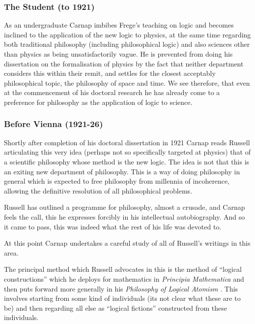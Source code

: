 \documentclass[10pt,titlepage]{book}
\newcommand{\ignore}[1]{}
\begin{document}
\subsubsection{The Student (to 1921)}

As an undergraduate Carnap imbibes Frege's teaching on logic and becomes inclined to the application of the new logic to physics, at the same  time regarding both traditional philosophy (including philosophical logic) and also sciences other than physics as being unsatisfactorily vague.
He is prevented from doing his dissertation on the formalisation of physics by the fact that neither department considers this within their remit, and settles for the closest acceptably philosophical topic, the philosophy of space and time.
We see therefore, that even at the commencement of his doctoral research he has already come to a preference for philosophy as the application of logic to science.

\subsubsection{Before Vienna (1921-26)}

Shortly after completion of his doctoral dissertation in 1921 Carnap reads Russell articulating this very idea (perhaps not so specifically targeted at physics) that of a scientific philosophy whose method is the new logic.
The idea is not that this is an exiting new department of philosophy.
This is a way of doing philosophy in general which is expected to free philosophy from millennia of incoherence, allowing the definitive resolution of all philosophical problems.

Russell has outlined a programme for philosophy, almost a crusade, and Carnap feels the call, this he expresses forcibly in his intellectual autobiography.
And so it came to pass, this was indeed what the rest of his life was devoted to.

At this point Carnap undertakes a careful study of all of Russell's writings in this area.

The principal method which Russell advocates in this is the method of ``logical constructions'' which he deploys for mathematics in \emph{Principia Mathematica} \cite{russell10} and then puts forward more generally in his \emph{Philosophy of Logical Atomism} \cite{russellPLA}\ignore{\cite{russell1956}}.
This involves starting from some kind of individuals (its not clear what these are to be) and then regarding all else as ``logical fictions'' constructed from these individuals.
\end{document}
